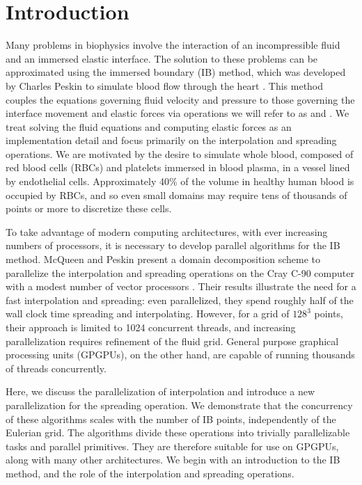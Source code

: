 \section{Introduction}

Many problems in biophysics involve the interaction of an incompressible fluid and an
immersed elastic interface. The solution to these problems can be approximated using the
immersed boundary (IB) method, which was developed by Charles Peskin to simulate blood
flow through the heart \cite{Peskin:1972wa}. This method couples the equations governing
fluid velocity and pressure to those governing the interface movement and elastic forces
via operations we will refer to as  and . We treat
solving the fluid equations and computing elastic forces as an implementation detail and
focus primarily on the interpolation and spreading operations. We are motivated by the
desire to simulate whole blood, composed of red blood cells (RBCs) and platelets immersed
in blood plasma, in a vessel lined by endothelial cells.  Approximately 40\% of the
volume in healthy human blood is occupied by RBCs, and so even small domains may require
tens of thousands of points or more to discretize these cells.

To take advantage of modern computing architectures, with ever increasing numbers of
processors, it is necessary to develop parallel algorithms for the IB method. McQueen and
Peskin present a domain decomposition scheme to parallelize the interpolation and
spreading operations on the Cray C-90 computer with a modest number of vector processors
\cite{McQueen:1997kw}.  Their results illustrate the need for a fast interpolation and
spreading: even parallelized, they spend roughly half of the wall clock time spreading
and interpolating.  However, for a grid of $128^3$ points, their approach is limited to
1024 concurrent threads, and increasing parallelization requires refinement of the
fluid grid. General purpose graphical processing units (GPGPUs), on the other hand,
are capable of running thousands of threads concurrently.

Here, we discuss the parallelization of interpolation and introduce a new parallelization
for the spreading operation. We demonstrate that the concurrency of these algorithms
scales with the number of IB points, independently of the Eulerian grid. The algorithms
divide these operations into trivially parallelizable tasks and parallel primitives. They
are therefore suitable for use on GPGPUs, along with many other architectures. We begin
with an introduction to the IB method, and the role of the interpolation and spreading
operations.

